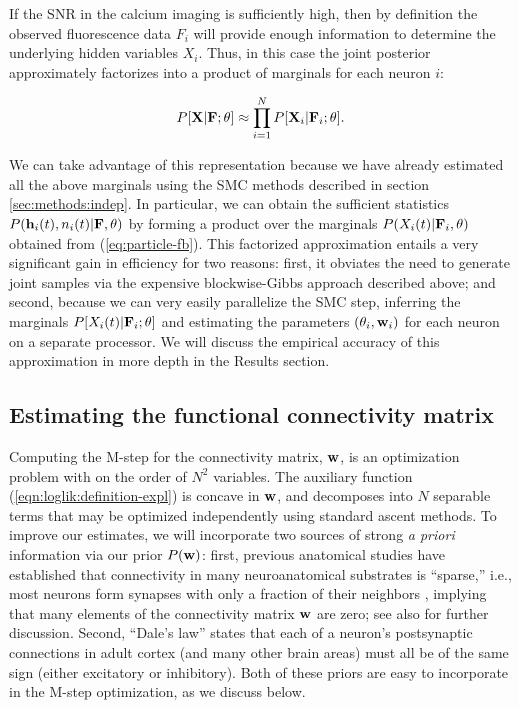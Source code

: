 If the SNR in the calcium imaging is sufficiently high, then by
definition the observed fluorescence data $F_i$ will provide enough
information to determine the underlying hidden variables $X_i$. Thus,
in this case the joint posterior approximately factorizes into a
product of marginals for each neuron $i$:

\begin{equation} \label{eqn:indep_approx}
  P[{\bf X}|{\bf F};\theta] \approx \prod_{i=1}^N P[\bX_i|\bF_i;
  \bth].
\end{equation}

We can take advantage of this representation because we have already
estimated all the above marginals using the SMC methods described in
section \ref{sec:methods:indep}. In particular, we can obtain the
sufficient statistics $P(\mathbf{h}_i(t),n_i(t) | {\bf F},\theta)$ by forming a
product over the marginals $P(X_i(t) | {\bf F}_i,\theta)$ obtained from
(\ref{eq:particle-fb}). This factorized approximation entails a very
significant gain in efficiency for two reasons: first, it obviates the
need to generate joint samples via the expensive blockwise-Gibbs
approach described above; and second, because we can very easily
parallelize the SMC step, inferring the marginals $P[X_i(t) | {\bf F}_i;
\mathbf{\theta}]$ and estimating the parameters $(\mathbf{\theta}_i, \mathbf{w}_i)$ for each neuron
on a separate processor.  We will discuss the empirical accuracy of
this approximation in more depth in the Results section.


\subsection{Estimating the functional connectivity matrix} \label{sec:methods:parameters HMM}

Computing the M-step for the connectivity matrix, $\mathbf{w}$, is an
optimization problem with on the order of $N^2$ variables.  The
auxiliary function (\ref{eqn:loglik:definition-expl}) is concave in
$\mathbf{w}$, and decomposes into $N$ separable terms that may be optimized
independently using standard ascent methods.  To improve our
estimates, we will incorporate two sources of strong \emph{a priori}
information via our prior $P(\mathbf{w})$: first, previous anatomical studies
have established that connectivity in many neuroanatomical substrates
is ``sparse,'' i.e., most neurons form synapses with only a fraction
of their neighbors
\cite{Buhl94,Thompson88,Reyes98,Feldmeyer99,Gupta00,FeldmeyerSakmann00,PetersenSakmann00,Binzegger04,Song2005,Mishchenko2009b},
implying that many elements of the connectivity matrix $\mathbf{w}$ are zero;
see also \cite{PAN04c,Rigat06,PILL07,Stevenson08} for further
discussion.  Second, ``Dale's law'' states that each of a neuron's
postsynaptic connections in adult cortex (and many other brain areas)
must all be of the same sign (either excitatory or inhibitory).  Both
of these priors are easy to incorporate in the M-step optimization, as
we discuss below.


